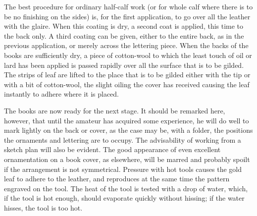 \documentclass[twoside]{book}
\begin{document}
The best procedure for ordinary half-calf work
(or for whole calf where there is to be no finishing on
the sides) is, for the first application, to go over all
the leather with the glaire. When this coating is
dry, a second coat is applied, this time to the back
only. A third coating can be given, either to the
entire back, as in the previous application, or merely
across the lettering piece. When the backs of the
books are sufficiently dry, a piece of cotton-wool to
which the least touch of oil or lard has been applied
is passed rapidly over all the surface that is to be
gilded. The strips of leaf are lifted to the place
that is to be gilded either with the tip or with a bit
of cotton-wool, the slight oiling the cover has
received causing the leaf instantly to adhere where it
is placed.

The books are now ready for the next stage. It
should be remarked here, however, that until the
amateur has acquired some experience, he will do
well to mark lightly on the back or cover, as the case
may be, with a folder, the positions the ornaments
and lettering are to occupy. The advisability of
working from a sketch plan will also be evident.
The good appearance of even excellent ornamentation
on a book cover, as elsewhere, will be marred and
probably spoilt if the arrangement is not symmetrical.
Pressure with hot tools causes the gold leaf to
adhere to the leather, and reproduces at the same
time the pattern engraved on the tool. The heat
\pagebreak
of the tool is tested with a drop of water, which, if
the tool is hot enough, should evaporate quickly
without hissing; if the water hisses, the tool is too
hot.
\end{document}
